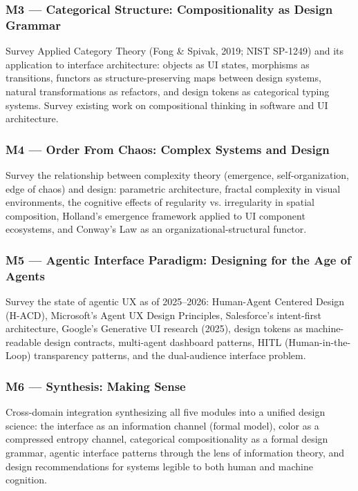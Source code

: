 \documentclass[11pt,letterpaper]{article}
\begin{document}
\subsubsection{M3 — Categorical Structure: Compositionality as Design Grammar}
Survey Applied Category Theory (Fong \& Spivak, 2019; NIST SP-1249) and its application to interface architecture: objects as UI states, morphisms as transitions, functors as structure-preserving maps between design systems, natural transformations as refactors, and design tokens as categorical typing systems. Survey existing work on compositional thinking in software and UI architecture.

\subsubsection{M4 — Order From Chaos: Complex Systems and Design}
Survey the relationship between complexity theory (emergence, self-organization, edge of chaos) and design: parametric architecture, fractal complexity in visual environments, the cognitive effects of regularity vs. irregularity in spatial composition, Holland's emergence framework applied to UI component ecosystems, and Conway's Law as an organizational-structural functor.

\subsubsection{M5 — Agentic Interface Paradigm: Designing for the Age of Agents}
Survey the state of agentic UX as of 2025--2026: Human-Agent Centered Design (H-ACD), Microsoft's Agent UX Design Principles, Salesforce's intent-first architecture, Google's Generative UI research (2025), design tokens as machine-readable design contracts, multi-agent dashboard patterns, HITL (Human-in-the-Loop) transparency patterns, and the dual-audience interface problem.

\subsubsection{M6 — Synthesis: Making Sense}
Cross-domain integration synthesizing all five modules into a unified design science: the interface as an information channel (formal model), color as a compressed entropy channel, categorical compositionality as a formal design grammar, agentic interface patterns through the lens of information theory, and design recommendations for systems legible to both human and machine cognition.
\end{document}
